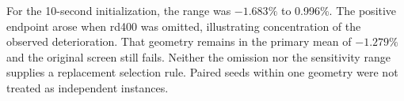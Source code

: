 For the 10-second initialization, the range was $-1.683\%$ to 0.996\%.
The positive endpoint arose when rd400 was omitted, illustrating concentration
of the observed deterioration. That geometry remains in the primary mean of
$-1.279\%$ and the original screen still fails. Neither the omission nor the
sensitivity range supplies a replacement selection rule. Paired seeds within
one geometry were not treated as independent instances.
